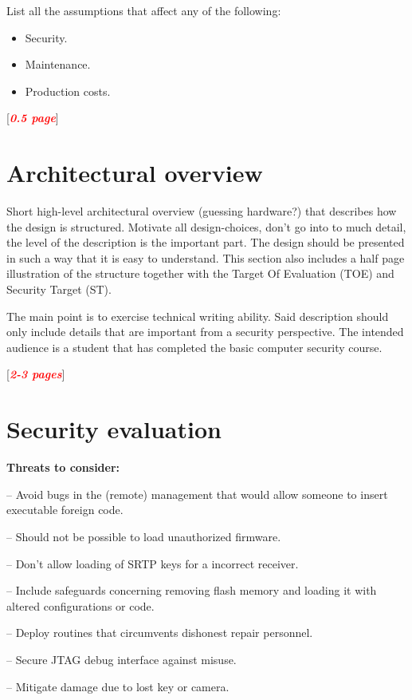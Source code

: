 \documentclass[10pt]{article}
\newcommand{\comm}[1]{{\leavevmode\color{gray}#1}}
\newcommand{\todo}[1]{
  \begin{center}
    [\textcolor{red}{\textbf{\textit{#1}}}]
  \end{center}
}
\newenvironment{checklist}{%
  \begin{list}{}{}%
  \let\olditem\item
  \renewcommand\item{\olditem -- \marginpar{$\Box$} }
  \newcommand\checkeditem{\olditem -- \marginpar{$\CheckedBox$} }
}{%
  \end{list}
}
\begin{document}
      \comm{
        List all the assumptions that affect any of the following:
        \begin{itemize}
          \item{Security.}
          \item{Maintenance.}
          \item{Production costs.}
        \end{itemize}
      }

      \todo{0.5 page}

  \section{Architectural overview}

    \comm{%
      Short high-level architectural overview (guessing hardware?) that
      describes how the design is structured. Motivate all design-choices,
      don't go into to much detail, the level of the description is the
      important part. The design should be presented in such a way that it is
      easy to understand. This section also includes a half page illustration
      of the structure together with the Target Of Evaluation (TOE) and
      Security Target (ST).

      The main point is to exercise technical writing ability. Said description
      should only include details that are important from a security
      perspective. The intended audience is a student that has completed the
      basic computer security course.
    }

    \todo{2-3 pages}

  \section{Security evaluation}

  \textbf{Threats to consider:}
  \begin{checklist}
    \item{Avoid bugs in the (remote) management that would allow someone to
      insert executable foreign code.}
    \item{Should not be possible to load unauthorized firmware.}
    \item{Don't allow loading of SRTP keys for a incorrect receiver.}
    \item{Include safeguards concerning removing flash memory and loading it
      with altered configurations or code.}
    \item{Deploy routines that circumvents dishonest repair personnel.}
    \item{Secure JTAG debug interface against misuse.}
    \item{Mitigate damage due to lost key or camera.}
  \end{checklist}
\end{document}
